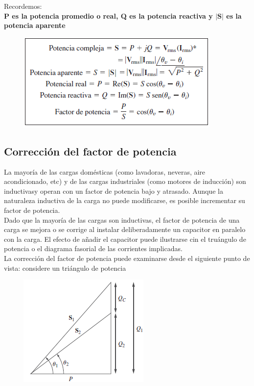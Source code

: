 Recordemos: \\

\textbf{P es la potencia promedio o real, Q es la potencia reactiva y $|\mathbf{S}|$ es la potencia aparente}

\begin{figure}[H]
    \centering
    \includegraphics{Elect_circ/pot_f3.png}
\end{figure}

\subsection{Corrección del factor de potencia}

La mayoría de las cargas domésticas (como lavadoras, neveras, aire acondicionado, etc) y de las cargas industriales (como motores de inducción) son inductivasy operan con un factor de potencia bajo y atrasado. Aunque la naturaleza inductiva de la carga no puede modificarse, es posible incrementar su factor de potencia. \\

Dado que la mayoría de las cargas son inductivas, el factor de potencia de una carga se mejora o se corrige al instalar deliberadamente un capacitor en paralelo con la carga. El efecto de añadir el capacitor puede ilustrarse cin el truángulo de potencia o el diagrama fasorial de las corrientes implicadas.\\

La corrección del factor de potencia puede examinarse desde el siguiente punto de vista: considere un triángulo de potencia 

\begin{figure}[H]
    \centering
    \includegraphics{Elect_circ/pot_f4.png}
\end{figure}

